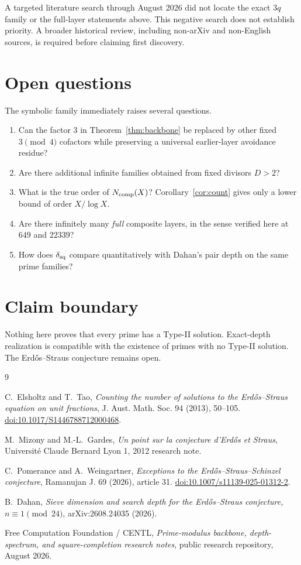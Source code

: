 \documentclass[11pt]{article}
\theoremstyle{definition}
\begin{document}
A targeted literature search through August 2026 did not locate the exact $3q$ family or the full-layer statements above.  This negative search does not establish priority.  A broader historical review, including non-arXiv and non-English sources, is required before claiming first discovery.

\section{Open questions}
The symbolic family immediately raises several questions.
\begin{enumerate}
\item Can the factor $3$ in Theorem~\ref{thm:backbone} be replaced by other fixed $3\pmod4$ cofactors while preserving a universal earlier-layer avoidance residue?
\item Are there additional infinite families obtained from fixed divisors $D>2$?
\item What is the true order of $N_{\rm comp}(X)$?  Corollary~\ref{cor:count} gives only a lower bound of order $X/\log X$.
\item Are there infinitely many \emph{full} composite layers, in the sense verified here at $649$ and $22339$?
\item How does $\delta_{\rm sq}$ compare quantitatively with Dahan's pair depth on the same prime families?
\end{enumerate}

\section*{Claim boundary}
Nothing here proves that every prime has a Type-II solution.  Exact-depth realization is compatible with the existence of primes with no Type-II solution.  The Erd\H{o}s--Straus conjecture remains open.

\begin{thebibliography}{9}

C.~Elsholtz and T.~Tao,
\emph{Counting the number of solutions to the Erd\H{o}s--Straus equation on unit fractions},
J. Aust. Math. Soc. 94 (2013), 50--105.
\href{https://doi.org/10.1017/S1446788712000468}{doi:10.1017/S1446788712000468}.

M.~Mizony and M.-L.~Gardes,
\emph{Un point sur la conjecture d'Erd\H{o}s et Straus},
Universit\'e Claude Bernard Lyon 1, 2012 research note.

C.~Pomerance and A.~Weingartner,
\emph{Exceptions to the Erd\H{o}s--Straus--Schinzel conjecture},
Ramanujan J. 69 (2026), article 31.
\href{https://doi.org/10.1007/s11139-025-01312-2}{doi:10.1007/s11139-025-01312-2}.

B.~Dahan,
\emph{Sieve dimension and search depth for the Erd\H{o}s--Straus conjecture, $n\equiv1\pmod{24}$},
arXiv:2608.24035 (2026).

Free Computation Foundation / CENTL,
\emph{Prime-modulus backbone, depth-spectrum, and square-completion research notes},
public research repository, August 2026.

\end{thebibliography}
\end{document}
